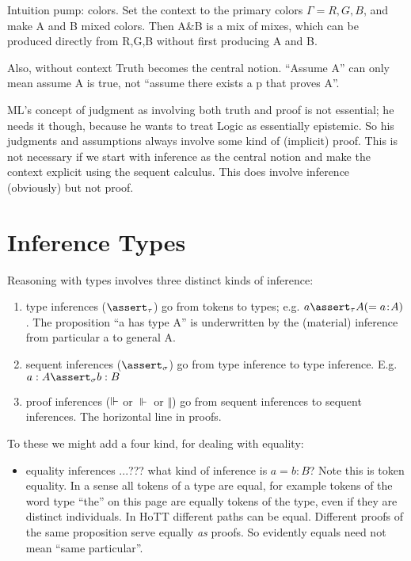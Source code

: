 \documentclass{article}
\begin{document}
Intuition pump: colors. Set the context to the primary colors \(\Gamma
= R,G,B\), and make A and B mixed colors. Then A\&B is a mix of mixes,
which can be produced directly from R,G,B without first producing A and
B.

Also, without context Truth becomes the central notion. ``Assume A''
can only mean assume A is true, not ``assume there exists a p that
proves A''.

ML's concept of judgment as involving both truth and proof is not
essential; he needs it though, because he wants to treat Logic as
essentially epistemic. So his judgments and assumptions always involve
some kind of (implicit) proof. This is not necessary if we start with
inference as the central notion and make the context explicit using
the sequent calculus. This does involve inference (obviously) but not
proof.

\section{Inference Types}

Reasoning with types involves three distinct kinds of inference:

\begin{enumerate}
\item type inferences (\(\tinfer\)) go from tokens to types; e.g. \(a\tinfer
  A (= \mbox{\tj{a}{A}})\). The proposition ``a has type A'' is underwritten by the
  (material) inference from particular a to general A.
\item sequent inferences (\(\sso\)) go from type inference to type inference.  E.g. \(a:A\sso b:B\)
\item proof inferences (\(\Vdash\) or \(\Vdash\) or  \(\Vert\)) go
  from sequent inferences to sequent inferences. The horizontal line
  in proofs.
\end{enumerate}

To these we might add a four kind, for dealing with equality:

\begin{itemize}
\item equality inferences ...??? what kind of inference is \(a=b:B\)?
  Note this is token equality. In a sense all tokens of a type are
  equal, for example tokens of the word type ``the'' on this page are
  equally tokens of the type, even if they are distinct individuals.
  In HoTT different paths can be equal. Different proofs of the same
  proposition serve equally \textit{as} proofs. So evidently equals
  need not mean ``same particular''.
\end{itemize}
\end{document}
